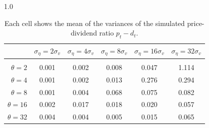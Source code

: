 \documentclass[12pt]{article}
\begin{document}
\begin{table}[h!]
\vspace{10pt}
\begin{subtable}{1.0\textwidth}
    \centering
\begin{tabular}{rccccc}
\hline  
            & \multicolumn{1}{l}{$\sigma_{\eta} =2\sigma_{v}$} & \multicolumn{1}{l}{$\sigma_{\eta} =4\sigma_{v}$} & \multicolumn{1}{l}{$\sigma_{\eta} =8\sigma_{v}$} & \multicolumn{1}{l}{$\sigma_{\eta} =16\sigma_{v}$} & \multicolumn{1}{l}{$\sigma_{\eta} =32\sigma_{v}$} \\ \hline  \vspace{-3mm} \\        
$\theta=2$  & 0.001                                             & 0.002                                             & 0.008                                             & 0.047                                              & 1.114                                              \\ \hline
$\theta=4$  & 0.001                                             & 0.002                                             & 0.013                                             & 0.276                                              & 0.294                                              \\ \hline
$\theta=8$  & 0.001                                             & 0.004                                             & 0.068                                             & 0.075                                              & 0.082                                              \\ \hline
$\theta=16$ & 0.002                                             & 0.017                                             & 0.018                                             & 0.020                                              & 0.057                                              \\ \hline
$\theta=32$ & 0.004                                             & 0.004                                             & 0.005                                             & 0.015                                              & 0.065                                              \\ \hline
\end{tabular}
\end{subtable}

\caption{Each cell shows the mean of the variances of the simulated price-dividend ratio $p_{t}-d_{t}$.}
\label{tabvarsamps}
\end{table}
\pagebreak
\end{document}
